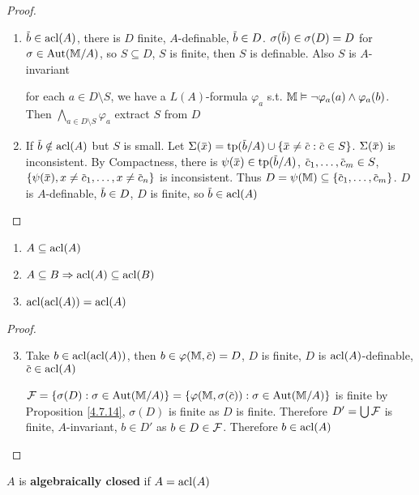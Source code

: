 \documentclass[11pt]{article}
\begin{document}
\begin{proof}
\begin{enumerate}
\item \(\barb\in\acl(A)\), there is \(D\) finite, \(A\)-definable, \(\barb\in D\). \(\sigma(\barb)\in\sigma(D)=D\)
for \(\sigma\in\operatorname{\text{Aut}}(\mathbb{M}/A)\), so \(S\subseteq D\), \(S\) is finite, then \(S\) is definable. Also \(S\)
is \(A\)-invariant

for each \(a\in D\setminus S\), we have a \(L(A)\)-formula \(\varphi_a\) s.t. \(\mathbb{M}\vDash\neg\varphi_a(a)\wedge\varphi_a(b)\).
Then \(\bigwedge_{a\in D\setminus S}\varphi_a\) extract \(S\) from \(D\)
\item If \(\barb\notin\acl(A)\) but \(S\) is small.
Let \(\Sigma(\barx)=\tp(\barb/A)\cup\{\barx\neq\barc:\barc\in S\}\). \(\Sigma(\barx)\) is inconsistent. By
Compactness, there
is \(\psi(\barx)\in\tp(\barb/A)\), \(\barc_1,\dots,\barc_m\in S\), \(\{\psi(\barx),x\neq\barc_1,\dots,x\neq\barc_n\}\) is
inconsistent. Thus \(D=\psi(\M)\subseteq\{\barc_1,\dots,\barc_m\}\). \(D\)
is \(A\)-definable, \(\barb\in D\), \(D\) is finite, so \(\barb\in\acl(A)\)
\end{enumerate}
\end{proof}

\begin{proposition}[]
\begin{enumerate}
\item \(A\subseteq\operatorname{acl}(A)\)
\item \(A\subseteq B\Rightarrow\operatorname{acl}(A)\subseteq\operatorname{acl}(B)\)
\item \(\operatorname{acl}(\operatorname{acl}(A))=\operatorname{acl}(A)\)
\end{enumerate}
\end{proposition}

\begin{proof}
\begin{enumerate}
\setcounter{enumi}{2}
\item Take \(b\in\operatorname{acl}(\operatorname{acl}(A))\), then \(b\in\varphi(\M,\barc)=D\), \(D\) is finite, \(D\)
is \(\operatorname{acl}(A)\)-definable, \(\barc\in\acl(A)\)

\(\calf=\{\sigma(D):\sigma\in\Aut(\M/A)\}=\{\varphi(\M,\sigma(\barc)):\sigma\in\Aut(\M/A)\}\) is finite by Proposition
\ref{4.7.14}, \(\sigma(D)\) is finite as \(D\) is finite. Therefore \(D'=\bigcup\mathcal{F}\) is
finite, \(A\)-invariant, \(b\in D'\) as \(b\in D\in\mathcal{F}\). Therefore \(b\in\operatorname{acl}(A)\)
\end{enumerate}
\end{proof}

\begin{definition}[]
\label{4.7.16}
\(A\) is \textbf{algebraically closed} if \(A=\operatorname{acl}(A)\)
\end{definition}
\end{document}
